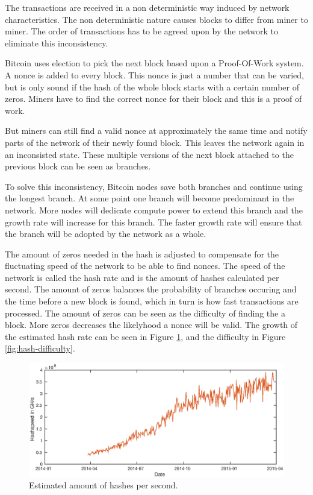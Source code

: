 The transactions are received in a non deterministic way induced by network characteristics.
The non deterministic nature causes blocks to differ from miner to miner.
The order of transactions has to be agreed upon by the network to eliminate this inconsistency.

Bitcoin uses election to pick the next block based upon a Proof-Of-Work system.
A nonce is added to every block.
This nonce is just a number that can be varied,
but is only sound if the hash of the whole block starts with a certain number of zeros.
Miners have to find the correct nonce for their block and this is a proof of work.

But miners can still find a valid nonce at approximately the same time
and notify parts of the network of their newly found block.
This leaves the network again in an inconsisted state.
These multiple versions of the next block attached to the previous block can be seen as branches.

To solve this inconsistency, Bitcoin nodes save both branches and continue using the longest branch.
At some point one branch will become predominant in the network.
More nodes will dedicate compute power to extend this branch and the growth rate will increase for this branch.
The faster growth rate will ensure that the branch will be adopted by the network as a whole.

The amount of zeros needed in the hash is adjusted to compensate for the fluctuating speed of the network to be able to find nonces.
The speed of the network is called the hash rate and is the amount of hashes calculated per second.
The amount of zeros balances the probability of branches occuring
and the time before a new block is found,
which in turn is how fast transactions are processed.
The amount of zeros can be seen as the difficulty of finding the a block.
More zeros decreases the likelyhood a nonce will be valid.
The growth of the estimated hash rate can be seen in Figure \ref{fig:hash-speed}\cite{Blockchain.info-hashspeed},
and the difficulty in Figure \ref{fig:hash-difficulty}\cite{Blockchain.info-difficulty}.

\begin{figure}[h]
        \centerline{\includegraphics[scale=0.5]{relatedWork/figs/hashspeed/hashspeed.eps}}
        \caption{Estimated amount of hashes per second.}
	\label{fig:hash-speed}
\end{figure}

